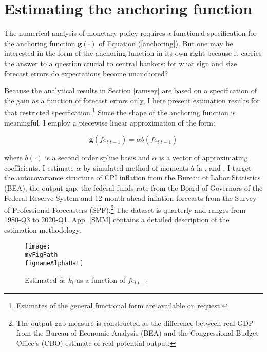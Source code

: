 \documentclass[11pt]{article}
\def \myFigPath {../../figures/}
\renewcommand{\[}{\begin{equation}}
\renewcommand{\]}{\end{equation}}
\def\mySmallFigScale{0.22}
\def\fignameAlphaHat{command_GMM_LOMgain_univariate_alph_opt_loss_273_nfe_7_16_Jul_2020}
\begin{document}
\section{Estimating the anchoring function}\label{estimation}
The numerical analysis of monetary policy requires a functional specification for the anchoring function $\mathbf{g}(\cdot)$ of Equation (\ref{anchoring}). But one may be interested in the form of the anchoring function in its own right because it carries the answer to a question crucial to central bankers: for what sign and size forecast errors do expectations become unanchored?

Because the analytical results in Section \ref{ramsey} are based on a specification of the gain as a function of forecast errors only, I here present estimation results for that restricted specification.\footnote{Estimates of the general functional form are available on request.} Since the shape of the anchoring function is meaningful, I employ a piecewise linear approximation of the form:

\begin{equation}
\mathbf{g}(fe_{t|t-1}) = \alpha b(fe_{t|t-1})\label{gain}
\end{equation}

where $b(\cdot)$ is a second order spline basis and $\alpha$ is a vector of approximating coefficients. I estimate $\alpha$ by simulated method of moments \`a la \cite{lee1991simulation}, \cite{duffie1990simulated} and \cite{smith1993SMM}. I target the autocovariance structure of CPI inflation from the Bureau of Labor Statistics (BEA), the output gap, the federal funds rate from the Board of Governors of the Federal Reserve System and 12-month-ahead inflation forecasts from the Survey of Professional Forecasters (SPF).\footnote{The output gap measure is constructed as the difference between real GDP from the Bureau of Economic Analysis (BEA) and the Congressional Budget Office's (CBO) estimate of real potential output.} The dataset is quarterly and ranges from 1980-Q3 to 2020-Q1. App. \ref{SMM} contains a detailed description of the estimation methodology.

\begin{figure}[h!]
\texttt{[image: \\myFigPath \\fignameAlphaHat]}
\caption{Estimated $\hat{\alpha}$: $k_t$ as a function of $fe_{t|t-1}$}
\label{alpha_hat}
\end{figure}
\end{document}
